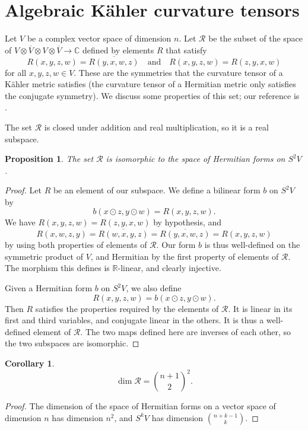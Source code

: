 \documentclass[10pt,a4paper]{article}
\newtheorem{prop}[theo]{Proposition}
\newtheorem{coro}[theo]{Corollary}
\newtheorem*{proof}{Proof}
\newcommand{\kk}[1]{\mathbb{#1}}
\newcommand{\cc}[1]{\mathcal{#1}}
\begin{document}
\section{Algebraic K\"ahler curvature tensors}
\label{sec:algebraic-curvature-tensors}

Let $V$ be a complex vector space of dimension $n$. Let $\cc R$ be the subset of the space of $V \otimes \overline V \otimes V \otimes \overline V \to \kk C$ defined by elements $R$ that satisfy
$$
R(x, y, z, w) = \overline{R(y, x, w, z)}
\quad\text{and}\quad
R(x, y, z, w) = R(z, y, x, w)
$$
for all $x,y,z,w \in V$. These are the symmetries that the curvature tensor of a K\"ahler metric satisfies (the curvature tensor of a Hermitian metric only satisfies the conjugate symmetry). We discuss some properties of this set; our reference is \cite{algebraic-kahler-curvature}.

The set $\cc R$ is closed under addition and real multiplication, so it is a real subspace.


\begin{prop}
The set $\cc R$ is isomorphic to the space of Hermitian forms on $S^2 V$.
\end{prop}

\begin{proof}
Let $R$ be an element of our subspace. We define a bilinear form $b$ on $S^2 V$ by
$$
b(x \odot z, y \odot w)
= R(x, y, z, w).
$$
We have $R(x,y,z,w) = R(z,y,x,w)$ by hypothesis, and
$$
R(x,w,z,y)
= \overline{R(w,x,y,z)}
= \overline{R(y,x,w,z)}
= R(x,y,z,w)
$$
by using both properties of elements of $\cc R$. Our form $b$ is thus well-defined on the symmetric product of $V$, and Hermitian by the first property of elements of $\cc R$. The morphism this defines is $\kk R$-linear, and clearly injective.

Given a Hermitian form $b$ on $S^2V$, we also define
$$
R(x,y,z,w) = b(x \odot z, y \odot w).
$$
Then $R$ satisfies the properties required by the elements of $\cc R$. It is linear in its first and third variables, and conjugate linear in the others. It is thus a well-defined element of $\cc R$. The two maps defined here are inverses of each other, so the two subspaces are isomorphic.
\end{proof}


\begin{coro}
$$
\dim \cc R
= \binom{n+1}{2}^2.
$$
\end{coro}


\begin{proof}
The dimension of the space of Hermitian forms on a vector space of dimension $n$ has dimension $n^2$, and $S^k V$ has dimension $\binom{n + k - 1}{k}$.
\end{proof}
\end{document}
